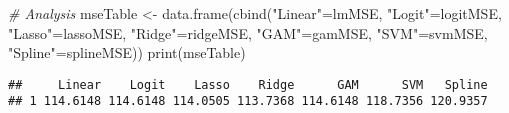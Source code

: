 \documentclass[
]{article}
\newenvironment{Shaded}{\begin{snugshade}}{\end{snugshade}}
\newcommand{\AttributeTok}[1]{\textcolor[rgb]{0.77,0.63,0.00}{#1}}
\newcommand{\CommentTok}[1]{\textcolor[rgb]{0.56,0.35,0.01}{\textit{#1}}}
\newcommand{\DecValTok}[1]{\textcolor[rgb]{0.00,0.00,0.81}{#1}}
\newcommand{\FunctionTok}[1]{\textcolor[rgb]{0.00,0.00,0.00}{#1}}
\newcommand{\NormalTok}[1]{#1}
\newcommand{\OtherTok}[1]{\textcolor[rgb]{0.56,0.35,0.01}{#1}}
\newcommand{\SpecialCharTok}[1]{\textcolor[rgb]{0.00,0.00,0.00}{#1}}
\newcommand{\StringTok}[1]{\textcolor[rgb]{0.31,0.60,0.02}{#1}}
\begin{document}
\begin{Shaded}
\end{Shaded}

\begin{Shaded}
\begin{Highlighting}[]
\CommentTok{\# Analysis}
\NormalTok{mseTable }\OtherTok{\textless{}{-}} \FunctionTok{data.frame}\NormalTok{(}\FunctionTok{cbind}\NormalTok{(}\StringTok{"Linear"}\OtherTok{=}\NormalTok{lmMSE, }\StringTok{"Logit"}\OtherTok{=}\NormalTok{logitMSE, }\StringTok{"Lasso"}\OtherTok{=}\NormalTok{lassoMSE, }\StringTok{"Ridge"}\OtherTok{=}\NormalTok{ridgeMSE, }\StringTok{"GAM"}\OtherTok{=}\NormalTok{gamMSE, }\StringTok{"SVM"}\OtherTok{=}\NormalTok{svmMSE, }\StringTok{"Spline"}\OtherTok{=}\NormalTok{splineMSE))}
\FunctionTok{print}\NormalTok{(mseTable)}
\end{Highlighting}
\end{Shaded}

\begin{verbatim}
##     Linear    Logit    Lasso    Ridge      GAM      SVM   Spline
## 1 114.6148 114.6148 114.0505 113.7368 114.6148 118.7356 120.9357
\end{verbatim}
\end{document}
